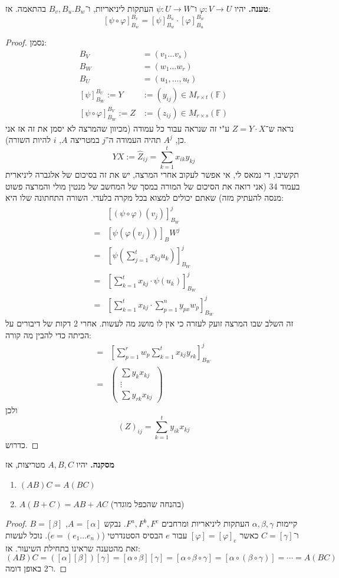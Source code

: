 \documentclass[]{article}
\newcommand\F         {\mathbb{F}}
\newcommand\co        {\colon}
\newcommand\ag        {\alpha}
\newcommand\bg        {\beta}
\newcommand\cg        {\gamma}
\newcommand\cl [1]    {\left ( #1 \right )}
\newcommand\csb[1]    {\left [ #1 \right ]}
\newcommand\pms[1]    {\begin{pmatrix}
		#1
\end{pmatrix}}
\renewcommand\phi     {\varphi}
\begin{document}
	\textbf{טענה. }
	יהיו $\phi \co V \to U$ ו־$\psi \co U \to W$ העתקות ליניאריות, ו־$B_v, B_u. B_w$ בהתאמה. אז: 
	\[ [\psi \circ \phi]_{B_w}^{B_v} = [\psi]_{B_w}^{B_u} \cdot [\phi]_{B_u}^{B_w} \]
	\begin{proof}
		נסמן: 
		\begin{align*}
			B_V &= (v_1 \dots v_s) \\
			B_W &= (w_1 \dots w_r) \\
			B_U &= (u_1, \dots, u_t) \\
			[\psi]^{B_U}_{B_W} := Y &:= (y_{ij}) \in M_{r \times t}(\F) \\
			[\psi \circ \phi]_{B_W}^{B_V} := Z &:= (z_{ij}) \in M_{r \times s}(\F)
		\end{align*}
		נראה ש־$Z = Y \cdot X$ ע"י זה שנראה עבור כל עמודה (מכיוון שהמרצה לא יסמן את זה אז אני כן, $A^j$ תהיה העמודה ה־$j$ במטריצה $A$, $i$ להיות השורה). 
		\[ YX := \hat Z_{ij} = \sum_{k = 1}^t x_{ik}y_{kj} \]
		תקשיבו, די נמאס לי, אי אפשר לעקוב אחרי המרצה, יש את זה בסיכום של אלגברה ליניארית בעמוד 34 (אני רואה את הסיכום של המורה במסך של המחשב של מנטין מולי והמרצה פשוט מנסה להעתיק מזה) שאתם יכולים למצוא בכל מקרה בלעדי. 
		השורה התחתונה שלו היא: 
		\begin{align*}
			&[(\psi \circ \phi)(v_j)]_{B_W}^j \\
			= &[\psi(\phi(v_j))]_B{W}^j \\
			= &\csb{\psi\cl{\sum_{j = 1}^{t}x_{kj}u_k}}_{B_W}^j \\
			= &\csb{\sum_{k = 1}^{t}x_{kj} \cdot \psi(u_k)}_{B_W}^j \\
			= &\csb{\sum_{k = 1}^{t}x_{kj} \cdot \sum_{p = 1}^{n}y_{px}w_p}_{B_W}^j
		\end{align*}
		זה השלב שבו המרצה זועק לעזרה כי אין לו מושג מה לעשות. אחרי 2 דקות של דיבורים על הכיתה כדי להבין מה קורה: 
		\begin{align*}
			= &\csb{\sum_{p = 1}^{r}w_p \sum_{k = 1}^{t}x_{kj}y_{rk}}_{B_W}^j \\
			= &\pms{\sum y_k x_{kj} \\ \vdots \\ \sum y_{rk}x_{kj}}
		\end{align*}
		ולכן
		\[ (Z)_{ij} = \sum_{k = 1}^{t}y_{ik}x_{kj} \]
		כדרוש. 
	\end{proof}
	
	\textbf{מסקנה. }יהיו $A, B, C$ מטריצות, אז 
	\begin{enumerate}
		\item $(AB)C = A(BC)$
		\item $A(B + C) = AB + AC$ (בהנחה שהכפל מוגדר)
	\end{enumerate}
	\begin{proof}
		קיימות $\ag, \bg, \cg$ העתקות ליניאריות ומרחבים $F^a, F^b, F^c$. נבקש $A = [\ag]$, $B =[\bg]$  ו־$C =[\cg]$ כאשר $[\phi] = [\phi]_e$ עבור $e$ הבסיס הסטנדרטי ($e = (e_1 \dots e_n)$). נוכל לעשות זאת מהטענה שראינו בתחילת השיעור. אז:
		\[ (AB)C = ([\ag] [\bg]) [\cg] = [\ag \circ \bg][\cg] = [\ag \circ \bg \circ \cg] = [\ag \circ (\bg \circ \cg)] = \cdots = A(BC) \]
		ו־2 באופן דומה. 
	\end{proof}
	
\end{document}
